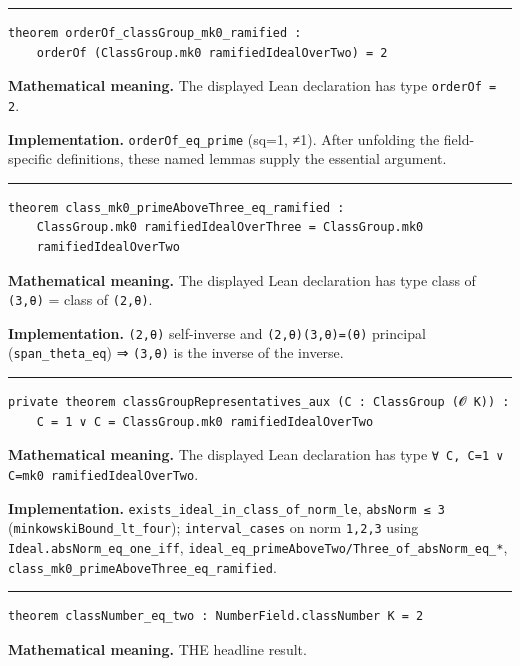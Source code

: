 \documentclass[UTF8,a4paper,11pt,fontset=fandol]{ctexart}
\theoremstyle{definition}
\newcommand{\statementsep}{\par\medskip\hrule\medskip}
\begin{document}
\statementsep
\begin{verbatim}
theorem orderOf_classGroup_mk0_ramified :
    orderOf (ClassGroup.mk0 ramifiedIdealOverTwo) = 2
\end{verbatim}
\noindent\textbf{Mathematical meaning.} The displayed Lean declaration has type \texttt{orderOf = 2}.\par
\noindent\textbf{Implementation.} \texttt{orderOf\_\allowbreak{}eq\_\allowbreak{}prime} (sq=1, ≠1). After unfolding the field-specific definitions, these named lemmas supply the essential argument.\par
\statementsep
\begin{verbatim}
theorem class_mk0_primeAboveThree_eq_ramified :
    ClassGroup.mk0 ramifiedIdealOverThree = ClassGroup.mk0
    ramifiedIdealOverTwo
\end{verbatim}
\noindent\textbf{Mathematical meaning.} The displayed Lean declaration has type class of \texttt{(3,θ)} = class of \texttt{(2,θ)}.\par
\noindent\textbf{Implementation.} \texttt{(2,θ)} self-inverse and \texttt{(2,θ)(3,θ)=(θ)} principal (\texttt{span\_\allowbreak{}theta\_\allowbreak{}eq}) ⇒ \texttt{(3,θ)} is the inverse of the inverse.\par
\statementsep
\begin{verbatim}
private theorem classGroupRepresentatives_aux (C : ClassGroup (𝓞 K)) :
    C = 1 ∨ C = ClassGroup.mk0 ramifiedIdealOverTwo
\end{verbatim}
\noindent\textbf{Mathematical meaning.} The displayed Lean declaration has type \texttt{∀ C, C=1 ∨ C=mk0 ramifiedIdealOverTwo}.\par
\noindent\textbf{Implementation.} \texttt{exists\_\allowbreak{}ideal\_\allowbreak{}in\_\allowbreak{}class\_\allowbreak{}of\_\allowbreak{}norm\_\allowbreak{}le}, \texttt{absNorm ≤ 3} (\texttt{minkowskiBound\_\allowbreak{}lt\_\allowbreak{}four}); \texttt{interval\_\allowbreak{}cases} on norm \texttt{1,2,3} using \texttt{Ideal.\allowbreak{}absNorm\_\allowbreak{}eq\_\allowbreak{}one\_\allowbreak{}iff}, \texttt{ideal\_\allowbreak{}eq\_\allowbreak{}primeAboveTwo/\allowbreak{}Three\_\allowbreak{}of\_\allowbreak{}absNorm\_\allowbreak{}eq\_\allowbreak{}*}, \texttt{class\_\allowbreak{}mk0\_\allowbreak{}primeAboveThree\_\allowbreak{}eq\_\allowbreak{}ramified}.\par
\statementsep
\begin{verbatim}
theorem classNumber_eq_two : NumberField.classNumber K = 2
\end{verbatim}
\noindent\textbf{Mathematical meaning.} THE headline result.\par
\end{document}
